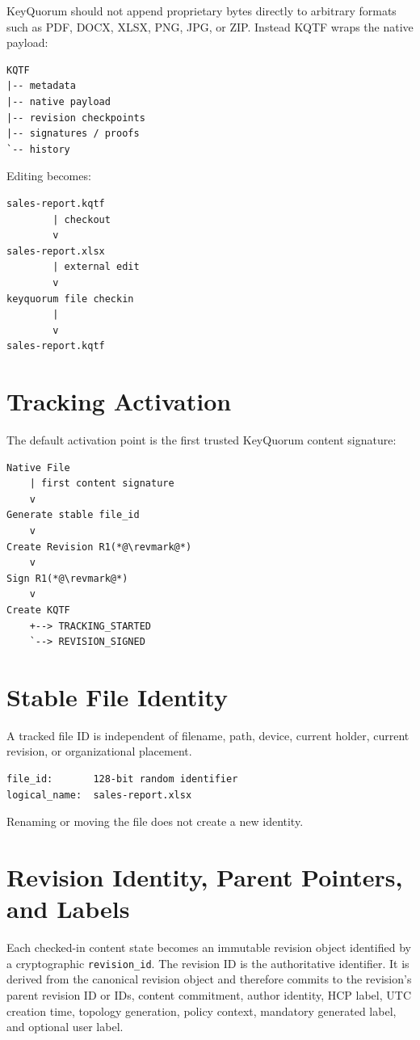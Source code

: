 \documentclass[11pt]{article}
\begin{document}
KeyQuorum should not append proprietary bytes directly to arbitrary formats such as PDF, DOCX, XLSX, PNG, JPG, or ZIP. Instead KQTF wraps the native payload:
\begin{lstlisting}
KQTF
|-- metadata
|-- native payload
|-- revision checkpoints
|-- signatures / proofs
`-- history
\end{lstlisting}

Editing becomes:
\begin{lstlisting}
sales-report.kqtf
        | checkout
        v
sales-report.xlsx
        | external edit
        v
keyquorum file checkin
        |
        v
sales-report.kqtf
\end{lstlisting}

\section{Tracking Activation}
The default activation point is the first trusted KeyQuorum content signature:
\begin{lstlisting}
Native File
    | first content signature
    v
Generate stable file_id
    v
Create Revision R1(*@\revmark@*)
    v
Sign R1(*@\revmark@*)
    v
Create KQTF
    +--> TRACKING_STARTED
    `--> REVISION_SIGNED
\end{lstlisting}

\section{Stable File Identity}
A tracked file ID is independent of filename, path, device, current holder, current revision, or organizational placement.
\begin{lstlisting}
file_id:       128-bit random identifier
logical_name:  sales-report.xlsx
\end{lstlisting}
Renaming or moving the file does not create a new identity.

\section{Revision Identity, Parent Pointers, and Labels}
Each checked-in content state becomes an immutable revision object identified by a cryptographic \texttt{revision\_id}. The revision ID is the authoritative identifier. It is derived from the canonical revision object and therefore commits to the revision's parent revision ID or IDs, content commitment, author identity, HCP label, UTC creation time, topology generation, policy context, mandatory generated label, and optional user label.
\end{document}
